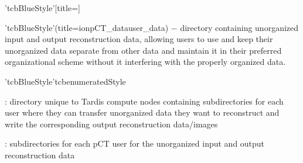 \par\bigskip\bigskip\bigskip
{}
\begin{tcbfunctionenv}'tcbBlueStyle'[title=]
\begin{tcbparagraph}'tcbBlueStyle'(title=\dirsep ion\dirsep pCT\_data\dirsep user\_data)%
$\boldsymbol{-}$ directory containing unorganized input and output reconstruction data, allowing users to use and keep their unorganized data separate from other data and maintain it in their preferred organizational scheme without it interfering with the properly organized data.
\end{tcbparagraph}
\begin{tcbparagraph}'tcbBlueStyle'{tcbenumeratedStyle}
\begin{deepList}[labelindent=1pt, leftmargin=*]
    \item {} : directory unique to Tardis compute nodes containing subdirectories for each user where they can transfer unorganized data they want to reconstruct and write the corresponding output reconstruction data/images
    \begin{deepList}[labelindent=1pt, leftmargin=*]
		\item {} : subdirectories for each pCT user for the unorganized input and output reconstruction data
	\end{deepList}
\end{deepList}
\end{tcbparagraph}
\end{tcbfunctionenv}
\endinput
